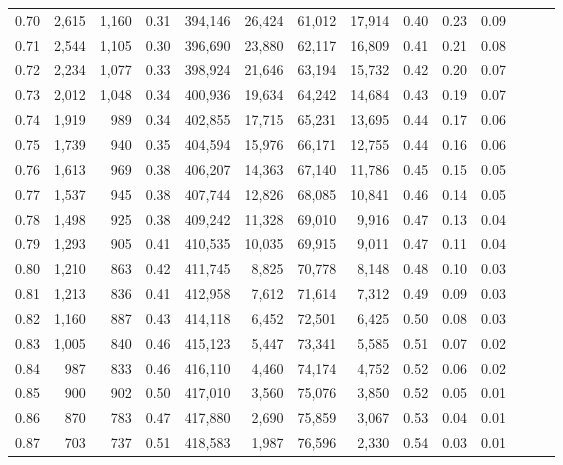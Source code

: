 \begin{tabular}{rrrrrrrrrrrrrr}
0.70 &   2,615 &  1,160 &  0.31 &  394,146 &   26,424 &  61,012 &  17,914 &  0.40 &  0.23 &      0.09 \\
0.71 &   2,544 &  1,105 &  0.30 &  396,690 &   23,880 &  62,117 &  16,809 &  0.41 &  0.21 &      0.08 \\
0.72 &   2,234 &  1,077 &  0.33 &  398,924 &   21,646 &  63,194 &  15,732 &  0.42 &  0.20 &      0.07 \\
0.73 &   2,012 &  1,048 &  0.34 &  400,936 &   19,634 &  64,242 &  14,684 &  0.43 &  0.19 &      0.07 \\
0.74 &   1,919 &    989 &  0.34 &  402,855 &   17,715 &  65,231 &  13,695 &  0.44 &  0.17 &      0.06 \\
0.75 &   1,739 &    940 &  0.35 &  404,594 &   15,976 &  66,171 &  12,755 &  0.44 &  0.16 &      0.06 \\
0.76 &   1,613 &    969 &  0.38 &  406,207 &   14,363 &  67,140 &  11,786 &  0.45 &  0.15 &      0.05 \\
0.77 &   1,537 &    945 &  0.38 &  407,744 &   12,826 &  68,085 &  10,841 &  0.46 &  0.14 &      0.05 \\
0.78 &   1,498 &    925 &  0.38 &  409,242 &   11,328 &  69,010 &   9,916 &  0.47 &  0.13 &      0.04 \\
0.79 &   1,293 &    905 &  0.41 &  410,535 &   10,035 &  69,915 &   9,011 &  0.47 &  0.11 &      0.04 \\
0.80 &   1,210 &    863 &  0.42 &  411,745 &    8,825 &  70,778 &   8,148 &  0.48 &  0.10 &      0.03 \\
0.81 &   1,213 &    836 &  0.41 &  412,958 &    7,612 &  71,614 &   7,312 &  0.49 &  0.09 &      0.03 \\
0.82 &   1,160 &    887 &  0.43 &  414,118 &    6,452 &  72,501 &   6,425 &  0.50 &  0.08 &      0.03 \\
0.83 &   1,005 &    840 &  0.46 &  415,123 &    5,447 &  73,341 &   5,585 &  0.51 &  0.07 &      0.02 \\
0.84 &     987 &    833 &  0.46 &  416,110 &    4,460 &  74,174 &   4,752 &  0.52 &  0.06 &      0.02 \\
0.85 &     900 &    902 &  0.50 &  417,010 &    3,560 &  75,076 &   3,850 &  0.52 &  0.05 &      0.01 \\
0.86 &     870 &    783 &  0.47 &  417,880 &    2,690 &  75,859 &   3,067 &  0.53 &  0.04 &      0.01 \\
0.87 &     703 &    737 &  0.51 &  418,583 &    1,987 &  76,596 &   2,330 &  0.54 &  0.03 &      0.01 \\

\end{tabular}
